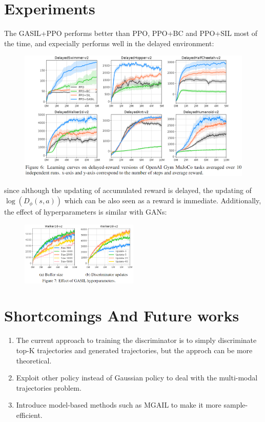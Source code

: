 \documentclass[UTF8, a4paper, 11pt]{article}
\begin{document}
\section{Experiments}
The GASIL+PPO performs better than PPO, PPO+BC and PPO+SIL most of the time, and expecially performs well in the delayed environment:
\begin{figure}[H]
    \centering
    \includegraphics[width = \textwidth]{delay.png}
\end{figure}
since although the updating of accumulated reward is delayed, the updating of $\log(D_\phi(s,a))$ which can be also seen as a reward is immediate. Additionally, the
effect of hyperparameters is similar with GANs:
\begin{figure}[H]
    \centering
    \includegraphics[width = 0.5\textwidth]{hyper.png}
\end{figure}
\section{Shortcomings And Future works}
\begin{enumerate}
    \item The current approach to training the discriminator is to simply discriminate top-K trajectories and generated trajectories, but the approch can be more
    theoretical.
    \item Exploit other policy instead of Gaussian policy to deal with the multi-modal trajectories problem.
    \item Introduce model-based methods such as MGAIL to make it more sample-efficient.
\end{enumerate}

%
%
\end{document}
